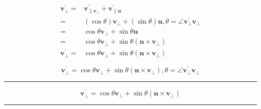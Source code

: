 \documentclass[
]{book}
\theoremstyle{definition}
\theoremstyle{definition}
\theoremstyle{definition}
\theoremstyle{definition}
\theoremstyle{remark}
\begin{document}
\[
\begin{aligned}
\boldsymbol{v}_{{\scriptscriptstyle \perp}}^{\prime}= & \boldsymbol{v}_{{\scriptscriptstyle \parallel\boldsymbol{v}_{{\scriptscriptstyle \perp}}}}^{\prime}+\boldsymbol{v}_{{\scriptscriptstyle \parallel\boldsymbol{u}}}^{\prime}\\
= & \left(\cos\theta\right)\boldsymbol{v}_{{\scriptscriptstyle \perp}}+\left(\sin\theta\right)\boldsymbol{u},\theta=\angle\boldsymbol{v}_{{\scriptscriptstyle \perp}}^{\prime}\boldsymbol{v}_{{\scriptscriptstyle \perp}}\\
= & \cos\theta\boldsymbol{v}_{{\scriptscriptstyle \perp}}+\sin\theta\boldsymbol{u}\\
= & \cos\theta\boldsymbol{v}_{{\scriptscriptstyle \perp}}+\sin\theta\left(\boldsymbol{n}\times\boldsymbol{v}_{{\scriptscriptstyle \perp}}\right)\\
\boldsymbol{v}_{{\scriptscriptstyle \perp}}^{\prime}= & \cos\theta\boldsymbol{v}_{{\scriptscriptstyle \perp}}+\sin\theta\left(\boldsymbol{n}\times\boldsymbol{v}_{{\scriptscriptstyle \perp}}\right)
\end{aligned}
\]

\[
\boldsymbol{v}_{{\scriptscriptstyle \perp}}^{\prime}=\cos\theta\boldsymbol{v}_{{\scriptscriptstyle \perp}}+\sin\theta\left(\boldsymbol{n}\times\boldsymbol{v}_{{\scriptscriptstyle \perp}}\right),\theta=\angle\boldsymbol{v}_{{\scriptscriptstyle \perp}}^{\prime}\boldsymbol{v}_{{\scriptscriptstyle \perp}}
\]

\begin{center}\rule{0.5\linewidth}{0.5pt}\end{center}

\[
\boldsymbol{v}_{{\scriptscriptstyle \perp}}^{\prime}=\cos\theta\boldsymbol{v}_{{\scriptscriptstyle \perp}}+\sin\theta\left(\boldsymbol{n}\times\boldsymbol{v}_{{\scriptscriptstyle \perp}}\right)
\]

\begin{center}\rule{0.5\linewidth}{0.5pt}\end{center}
\end{document}
